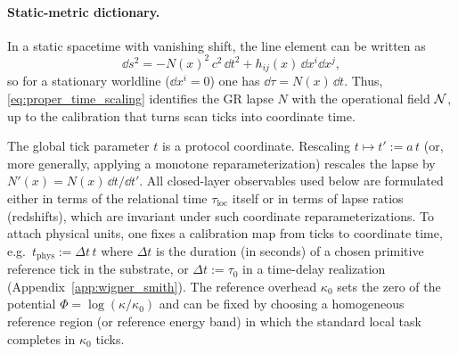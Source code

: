 \paragraph{Static-metric dictionary.}
In a static spacetime with vanishing shift, the line element can be written as
\[
\dd s^2=-N(x)^2\,c^2\,\dd t^2+h_{ij}(x)\,\dd x^i\dd x^j,
\]
so for a stationary worldline ($\dd x^i=0$) one has $\dd \tau=N(x)\,\dd t$.
Thus, \eqref{eq:proper_time_scaling} identifies the GR lapse $N$ with the operational field $\mathcal{N}$, up to the calibration that turns scan ticks into coordinate time.

\begin{remark}
\label{rem:lapse_calibration_reparam}
The global tick parameter $t$ is a protocol coordinate.
Rescaling $t\mapsto t':=a\,t$ (or, more generally, applying a monotone reparameterization) rescales the lapse by $N'(x)=N(x)\,\dd t/\dd t'$.
All closed-layer observables used below are formulated either in terms of the relational time $\tau_{\mathrm{loc}}$ itself or in terms of lapse ratios (redshifts), which are invariant under such coordinate reparameterizations.
To attach physical units, one fixes a calibration map from ticks to coordinate time, e.g.\ $t_{\mathrm{phys}}:=\Delta t\,t$ where $\Delta t$ is the duration (in seconds) of a chosen primitive reference tick in the substrate, or $\Delta t:=\tau_0$ in a time-delay realization (Appendix~\ref{app:wigner_smith}).
The reference overhead $\kappa_0$ sets the zero of the potential $\Phi=\log(\kappa/\kappa_0)$ and can be fixed by choosing a homogeneous reference region (or reference energy band) in which the standard local task completes in $\kappa_0$ ticks.
\end{remark}

